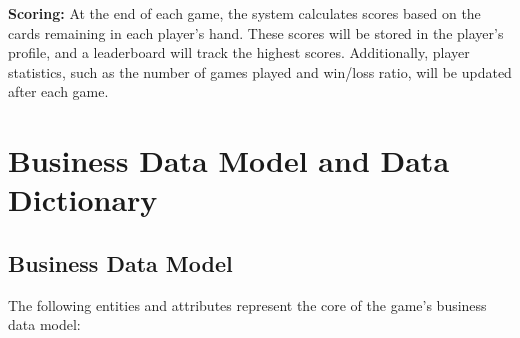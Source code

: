 \documentclass{article}
\begin{document}
\textbf{Scoring:} At the end of each game, the system calculates scores based on the cards remaining in each player's hand. These scores will be stored in the player's profile, and a leaderboard will track the highest scores. Additionally, player statistics, such as the number of games played and win/loss ratio, will be updated after each game.

\section{Business Data Model and Data Dictionary}

\subsection{Business Data Model}
The following entities and attributes represent the core of the game’s business data model:
\end{document}

